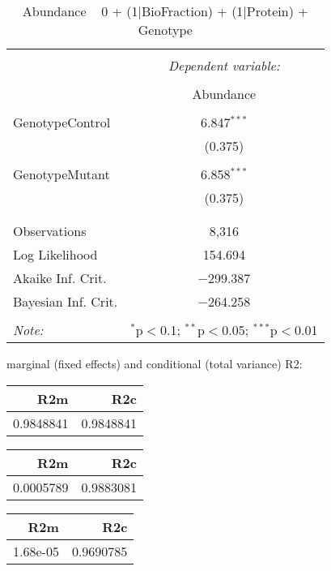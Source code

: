 \documentclass[11pt]{report}
\begin{document}
\begin{table}[!htbp] \centering 
  \caption{Abundance ~ 0 + (1|BioFraction) + (1|Protein) + Genotype} 
  \label{} 
\begin{tabular}{@{\extracolsep{5pt}}lc} 
\\[-1.8ex]\hline 
\hline \\[-1.8ex] 
 & \multicolumn{1}{c}{\textit{Dependent variable:}} \\ 
\cline{2-2} 
\\[-1.8ex] & Abundance \\ 
\hline \\[-1.8ex] 
 GenotypeControl & 6.847$^{***}$ \\ 
  & (0.375) \\ 
  & \\ 
 GenotypeMutant & 6.858$^{***}$ \\ 
  & (0.375) \\ 
  & \\ 
\hline \\[-1.8ex] 
Observations & 8,316 \\ 
Log Likelihood & 154.694 \\ 
Akaike Inf. Crit. & $-$299.387 \\ 
Bayesian Inf. Crit. & $-$264.258 \\ 
\hline 
\hline \\[-1.8ex] 
\textit{Note:}  & \multicolumn{1}{r}{$^{*}$p$<$0.1; $^{**}$p$<$0.05; $^{***}$p$<$0.01} \\ 
\end{tabular} 
\end{table} 
marginal (fixed effects) and conditional (total variance) R2:

\begin{tabular}{r|r}
\hline
R2m & R2c\\
\hline
0.9848841 & 0.9848841\\
\hline
\end{tabular}

\begin{tabular}{r|r}
\hline
R2m & R2c\\
\hline
0.0005789 & 0.9883081\\
\hline
\end{tabular}

\begin{tabular}{r|r}
\hline
R2m & R2c\\
\hline
1.68e-05 & 0.9690785\\
\hline
\end{tabular}
\end{document}
